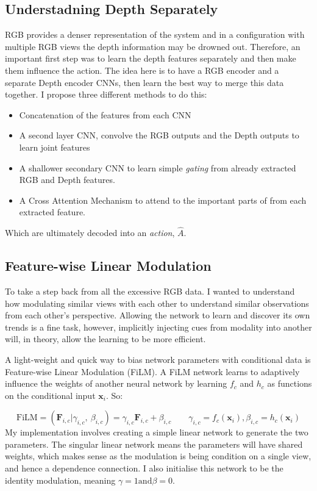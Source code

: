 \subsection{Understadning Depth Separately}\label{subsec:policies-understand-depth-sep}
RGB provides a denser representation of the system and in a configuration with multiple RGB views the depth information may be drowned out. Therefore, an important first step was to learn the depth features separately and then make them influence the action. The idea here is to have a RGB encoder and a separate Depth encoder CNNs, then learn the best way to merge this data together. I propose three different methods to do this:

\begin{itemize}
  \item Concatenation of the features from each CNN 
  \item A second layer CNN, convolve the RGB outputs and the Depth outputs to learn joint features 
  \item A shallower secondary CNN to learn simple \emph{gating} from already extracted RGB and Depth features. 
  \item A Cross Attention Mechanism to attend to the important parts of from each extracted feature.
\end{itemize}
Which are ultimately decoded into an \emph{action}, $\hat{A}$.

\subsection{Feature-wise Linear Modulation}
To take a step back from all the excessive RGB data. I wanted to understand how modulating similar views with each other to understand similar observations from each other's perspective. Allowing the network to learn and discover its own trends is a fine task, however, implicitly injecting cues from modality into another will, in theory, allow the learning to be more efficient.


A light-weight and quick way to bias network parameters with conditional data is Feature-wise Linear Modulation (FiLM). 
A FiLM network learns to adaptively influence the weights of another neural network by learning $f_c$ and $h_c$ as functions on the conditional input $\mathbf{x}_i$. So:

\[
\text{FiLM} = \left( \mathbf{F}_{i, c} | \gamma_{i, c}, ~\beta_{i, c} \right) = \gamma_{i, c}\mathbf{F}_{i, c} + \beta_{i, c} \qquad  \gamma_{i, c} = f_c\left(\mathbf{x}_i \right), \beta_{i, c} = h_c \left( \mathbf {x}_i \right)
\]
My implementation involves  creating a simple linear network to generate the two parameters. The singular linear network means the parameters will have shared weights, which makes sense as the modulation is being condition on a single view, and hence a dependence connection. I also initialise this network to be the identity modulation, meaning \(\gamma = 1 \text{and} \beta = 0\). 

